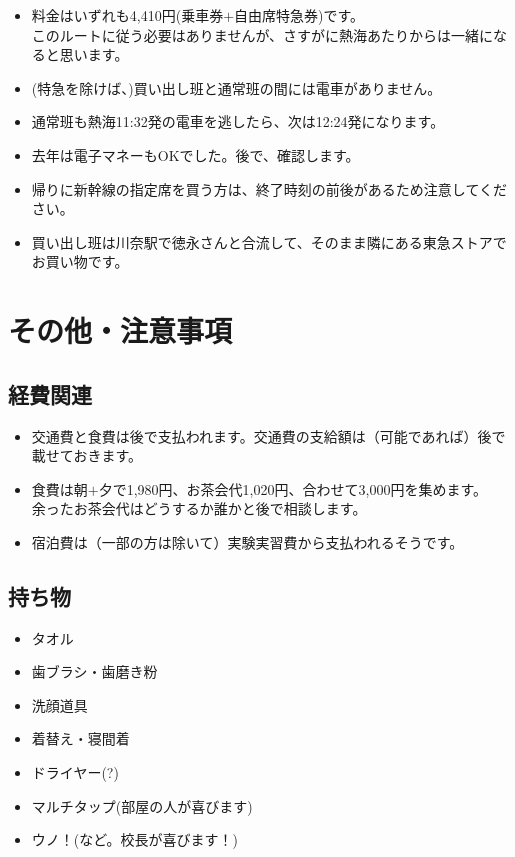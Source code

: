 \documentclass[unicode,a4paper,11pt]{ltjsarticle}
\begin{document}
\begin{itemize}
      \item
            料金はいずれも4,410円(乗車券$+$自由席特急券)です。\\
            このルートに従う必要はありませんが、さすがに熱海あたりからは一緒になると思います。
      \item
            (特急を除けば、)買い出し班と通常班の間には電車がありません。
      \item
            通常班も熱海11:32発の電車を逃したら、次は12:24発になります。
      \item
            去年は電子マネーもOKでした。後で、確認します。
      \item
            帰りに新幹線の指定席を買う方は、終了時刻の前後があるため注意してください。
      \item
            買い出し班は川奈駅で徳永さんと合流して、そのまま隣にある東急ストアでお買い物です。
\end{itemize}


\section{その他・注意事項}

\subsection*{経費関連}

\begin{itemize}
      \item
            交通費と食費は後で支払われます。交通費の支給額は（可能であれば）後で載せておきます。
      \item
            食費は朝$+$夕で1,980円、お茶会代1,020円、合わせて3,000円を集めます。\\
            余ったお茶会代はどうするか誰かと後で相談します。
      \item
            宿泊費は（一部の方は除いて）実験実習費から支払われるそうです。
\end{itemize}

\subsection*{持ち物}

\begin{itemize}
      \item
            タオル
      \item
            歯ブラシ・歯磨き粉
      \item
            洗顔道具
      \item
            着替え・寝間着
      \item
            ドライヤー(?)
      \item
            マルチタップ(部屋の人が喜びます)
      \item
            ウノ！(など。校長が喜びます！)
\end{itemize}
\end{document}
